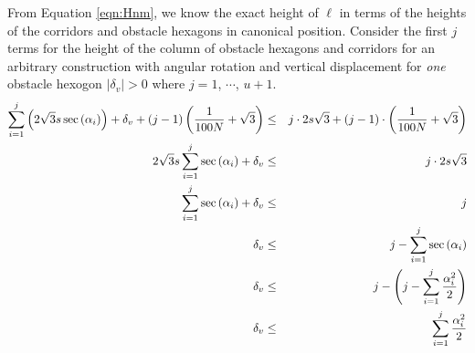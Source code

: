 

From Equation \ref{eqn:Hnm}, we know the exact height of $\ell$ in terms of the heights of the corridors and obstacle hexagons in canonical position.  
Consider the first $j$ terms for the height of the column of obstacle hexagons and corridors for an arbitrary construction with angular rotation and vertical displacement for \textit{one} obstacle hexogon $\vert \delta_v \vert > 0$ where $j=1$, $\cdots$, $u+1$.
\begin{eqnarray*}
\sum_{i=1}^j \left( 2 \sqrt{3} s \sec \left(  \alpha_i \right) \right) + \delta_v  + (j-1) \left( \frac{1}{100N}+\sqrt{3} \right) &\leq& j \cdot 2 s \sqrt{3} + (j-1) \cdot \left( \frac{1}{100N}+\sqrt{3} \right)\\
2 \sqrt{3} s \sum_{i=1}^j \sec \left( \alpha_i \right) + \delta_ v &\leq& j \cdot 2 s \sqrt{3}  \\
\sum_{i=1}^j \sec \left( \alpha_i \right) + \delta_v &\leq& j\\
 \delta_v &\leq& j- \sum_{i=1}^j \sec \left( \alpha_i \right)\\
 \delta_v &\leq& j - \left( j - \sum_{i=1}^j \frac{\alpha_i^2}{2} \right)\\
\delta_v &\leq&  \sum_{i=1}^j \frac{\alpha_i^2}{2}
\end{eqnarray*}

